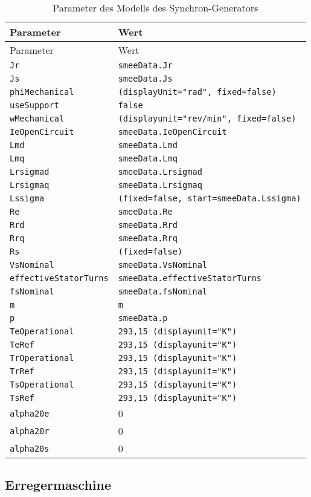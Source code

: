 \begin{longtable}[]{@{}ll@{}}
\caption{Parameter des Modells des Synchron-Generators}\tabularnewline
\toprule
Parameter & Wert\tabularnewline
\midrule
\endfirsthead
\toprule
Parameter & Wert\tabularnewline
\midrule
\endhead
\texttt{Jr} & \texttt{smeeData.Jr}\tabularnewline
\texttt{Js} & \texttt{smeeData.Js}\tabularnewline
\texttt{phiMechanical} &
\texttt{(displayUnit="rad",\ fixed=false)}\tabularnewline
\texttt{useSupport} & \texttt{false}\tabularnewline
\texttt{wMechanical} &
\texttt{(displayunit="rev/min",\ fixed=false)}\tabularnewline
\texttt{IeOpenCircuit} & \texttt{smeeData.IeOpenCircuit}\tabularnewline
\texttt{Lmd} & \texttt{smeeData.Lmd}\tabularnewline
\texttt{Lmq} & \texttt{smeeData.Lmq}\tabularnewline
\texttt{Lrsigmad} & \texttt{smeeData.Lrsigmad}\tabularnewline
\texttt{Lrsigmaq} & \texttt{smeeData.Lrsigmaq}\tabularnewline
\texttt{Lssigma} &
\texttt{(fixed=false,\ start=smeeData.Lssigma)}\tabularnewline
\texttt{Re} & \texttt{smeeData.Re}\tabularnewline
\texttt{Rrd} & \texttt{smeeData.Rrd}\tabularnewline
\texttt{Rrq} & \texttt{smeeData.Rrq}\tabularnewline
\texttt{Rs} & \texttt{(fixed=false)}\tabularnewline
\texttt{VsNominal} & \texttt{smeeData.VsNominal}\tabularnewline
\texttt{effectiveStatorTurns} &
\texttt{smeeData.effectiveStatorTurns}\tabularnewline
\texttt{fsNominal} & \texttt{smeeData.fsNominal}\tabularnewline
\texttt{m} & \texttt{m}\tabularnewline
\texttt{p} & \texttt{smeeData.p}\tabularnewline
\texttt{TeOperational} &
\texttt{293,15\ (displayunit="K")}\tabularnewline
\texttt{TeRef} & \texttt{293,15\ (displayunit="K")}\tabularnewline
\texttt{TrOperational} &
\texttt{293,15\ (displayunit="K")}\tabularnewline
\texttt{TrRef} & \texttt{293,15\ (displayunit="K")}\tabularnewline
\texttt{TsOperational} &
\texttt{293,15\ (displayunit="K")}\tabularnewline
\texttt{TsRef} & \texttt{293,15\ (displayunit="K")}\tabularnewline
\texttt{alpha20e} & 0\tabularnewline
\texttt{alpha20r} & 0\tabularnewline
\texttt{alpha20s} & 0\tabularnewline
\bottomrule
\end{longtable}

\hypertarget{erregermaschine}{%
\subsection{Erregermaschine}\label{erregermaschine}}

